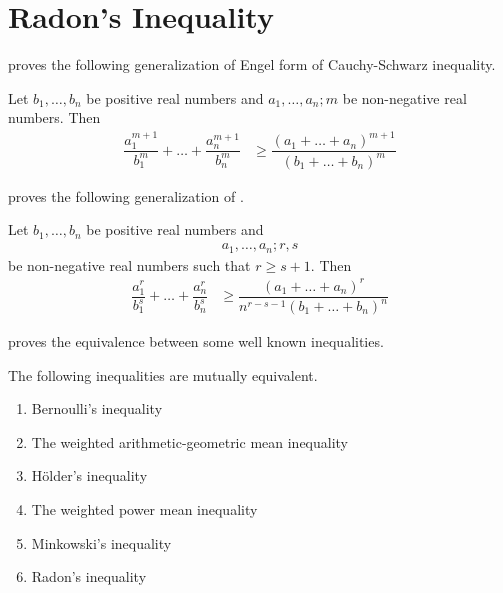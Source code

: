 \documentclass[inequalities.tex]{subfile}
\begin{document}
	\section{Radon's Inequality}\label{sec:radon}
	 \textcite{johann_radon_1913} proves the following generalization of Engel form of Cauchy-Schwarz inequality.
		\begin{theorem}\label{thm:radon}
			Let $b_{1},\ldots,b_{n}$ be positive real numbers and $a_{1},\ldots,a_{n};m$ be non-negative real numbers. Then
				\begin{align*}
					\dfrac{a_{1}^{m+1}}{b_{1}^{m}}+\ldots+\dfrac{a_{n}^{m+1}}{b_{n}^{m}}
						& \geq \dfrac{(a_{1}+\ldots+a_{n})^{m+1}}{(b_{1}+\ldots+b_{n})^{m}}
				\end{align*}
		\end{theorem}
	\textcite{yang_2002} proves the following generalization of .
		\begin{theorem}\label{thm:genradon}
			Let $b_{1},\ldots,b_{n}$ be positive real numbers and
				\begin{align*}
					a_{1},\ldots,a_{n};r,s
				\end{align*}
			be non-negative real numbers such that $r\geq s+1$. Then
				\begin{align*}
					\dfrac{a_{1}^{r}}{b_{1}^{s}}+\ldots+\dfrac{a_{n}^{r}}{b_{n}^{s}}
						& \geq \dfrac{(a_{1}+\ldots+a_{n})^{r}}{n^{r-s-1}(b_{1}+\ldots+b_{n})^{n}}
				\end{align*}
		\end{theorem}
	\textcite{yongtao_xian_xiao_2018} proves the equivalence between some well known inequalities.
		\begin{theorem}
			The following inequalities are mutually equivalent.
				\begin{enumerate}[\itshape i.]
					\item Bernoulli's inequality
					\item The weighted arithmetic-geometric mean inequality
					\item H\"{o}lder's inequality
					\item The weighted power mean inequality
					\item Minkowski's inequality
					\item Radon's inequality
				\end{enumerate}
		\end{theorem}
\end{document}
